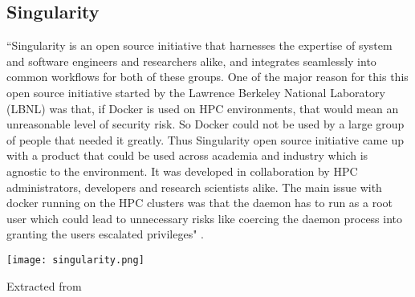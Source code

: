 \subsection{Singularity}
``Singularity is an open source initiative that harnesses the expertise of system and software engineers and researchers alike, and integrates seamlessly into common workflows for both of these groups. One of the major reason for this this open source initiative started by the Lawrence Berkeley National Laboratory (LBNL) was that, if Docker is used on HPC environments, that would mean an unreasonable level of security risk. So Docker could not be used by a large group of people that needed it greatly. Thus Singularity open source initiative came up with a product that could be used across academia and industry which is agnostic to the environment. It was developed in collaboration by HPC administrators, developers and research scientists alike. The main issue with docker running on the HPC clusters was that the daemon has to run as a root user which could lead to unnecessary risks like coercing the daemon process into granting the users escalated privileges" \cite{10.1371/journal.pone.0177459}.\\

\begin{center}
\texttt{[image: singularity.png]}
\label{fig:singularity_workflow}
\caption*{Extracted from \cite{10.1371/journal.pone.0177459}}
\end{center}

